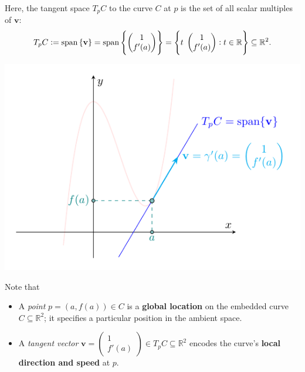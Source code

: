 \documentclass[11pt,openany]{article}
\renewcommand{\vec}[1]{\mathbf{#1}}
\begin{document}
Here, the tangent space $T_pC$ to the curve \(C\) at \(p\) is the set of all scalar multiples of \(\vec v\):
\[
T_pC := \mathrm{span}\set{\vec{v}}=\mathrm{span}\set{\begin{pmatrix} 1 \\ f'(a) \end{pmatrix}}=\set{t\;\begin{pmatrix} 1 \\ f'(a) \end{pmatrix}:t\in\R}
\subseteq \mathbb{R}^2.
\]
\begin{center}
	\includegraphics[scale=1]{tangent-space-3-2.pdf}
\end{center}
\newpage
Note that
\begin{itemize}
	\item A \emph{point} $p = (a, f(a)) \in C$ is a \textbf{global location} on the embedded curve $C \subseteq \mathbb{R}^2$; it specifies a particular position in the ambient space.
	\item A \emph{tangent vector} \( \vec{v}=\begin{pmatrix}1\\ f'(a)\end{pmatrix} \in T_pC \subseteq \mathbb{R}^2 \) encodes the curve’s \textbf{local direction and speed} at $p$.
\end{itemize}
\end{document}

